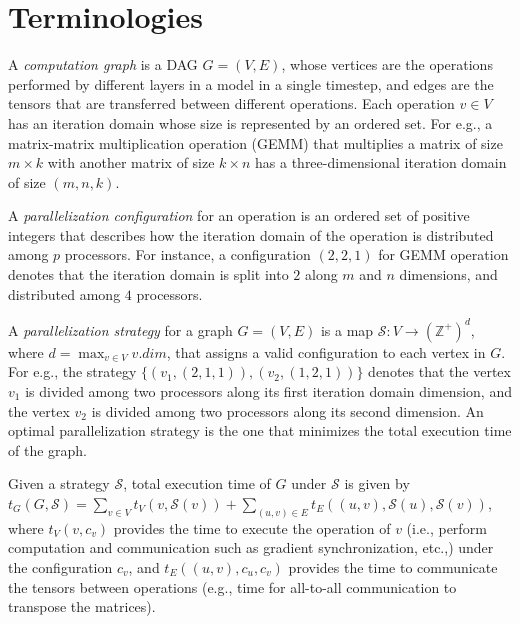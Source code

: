 \documentclass{article}
\newcommand{\strategy}{\mathcal{S}}
\newcommand{\vertcost}[1]{t_V(#1)}
\newcommand{\edgecost}[1]{t_E(#1)}
\newcommand{\set}[1]{\{#1\}}
\begin{document}
\section{Terminologies}
A \emph{computation graph} is a DAG $G=(V,E)$, whose vertices are the operations
performed by different layers in a model in a single timestep, and edges are the
tensors that are transferred between different operations. 
Each operation $v\in V$ has an iteration domain whose size is represented by an
ordered set.
For e.g., a matrix-matrix multiplication operation (GEMM) that multiplies a matrix of
size $m\times k$ with another matrix of size $k\times n$ has a three-dimensional
iteration domain of size $(m,n,k)$.

A \emph{parallelization configuration} for an operation is an ordered set of
positive integers that describes how the iteration domain of the operation is
distributed among $p$ processors. For instance, a configuration $(2,2,1)$ for
GEMM operation denotes that the iteration domain is split into $2$ along $m$ and
$n$ dimensions, and distributed among $4$ processors.

A \emph{parallelization strategy} for a graph $G=(V,E)$ is a map $\strategy: V \rightarrow
\mathbb{(Z^+)}^{d}$, where $d=\max_{v\in V} v.dim$, that
assigns a valid configuration to each vertex in $G$. For e.g., the strategy
$\set{(v_1, (2,1,1)), (v_2, (1,2,1))}$ denotes that the vertex $v_1$ is divided
among two processors along its first iteration domain dimension, and the vertex
$v_2$ is divided among two processors along its second dimension. An optimal
parallelization strategy is the one that minimizes the total execution time of
the graph.

Given a strategy $\strategy$, total execution time of $G$ under $\strategy$ is
given by $t_G(G, \strategy) = \sum_{v\in V} \vertcost{v, \strategy(v)} +
\sum_{(u,v)\in E} \edgecost{(u,v), \strategy(u), \strategy(v)}$, where
$\vertcost{v,c_v}$ provides the time to execute the operation of $v$ (i.e.,
perform computation and communication such as gradient synchronization, etc.,)
under the configuration $c_v$, and $\edgecost{(u,v), c_u, c_v}$ provides the
time to communicate the tensors between operations (e.g., time for all-to-all
communication to transpose the matrices).
\end{document}
